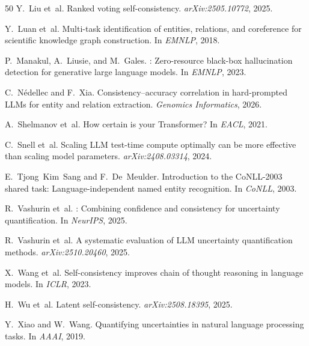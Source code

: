 \documentclass[11pt,a4paper]{article}
\begin{document}
\begin{thebibliography}{50}
Y.~Liu et~al.
\newblock Ranked voting self-consistency.
\newblock \emph{arXiv:2505.10772}, 2025.

Y.~Luan et~al.
\newblock Multi-task identification of entities, relations, and coreference for scientific knowledge graph construction.
\newblock In \emph{EMNLP}, 2018.

P.~Manakul, A.~Liusie, and M.~Gales.
: Zero-resource black-box hallucination detection for generative large language models.
\newblock In \emph{EMNLP}, 2023.

C.~N{\'e}dellec and F.~Xia.
\newblock Consistency--accuracy correlation in hard-prompted {LLM}s for entity and relation extraction.
\newblock \emph{Genomics Informatics}, 2026.

A.~Shelmanov et~al.
\newblock How certain is your {T}ransformer?
\newblock In \emph{EACL}, 2021.

C.~Snell et~al.
\newblock Scaling {LLM} test-time compute optimally can be more effective than scaling model parameters.
\newblock \emph{arXiv:2408.03314}, 2024.

E.~Tjong~Kim~Sang and F.~De~Meulder.
\newblock Introduction to the {CoNLL}-2003 shared task: Language-independent named entity recognition.
\newblock In \emph{CoNLL}, 2003.

R.~Vashurin et~al.
: Combining confidence and consistency for uncertainty quantification.
\newblock In \emph{NeurIPS}, 2025.

R.~Vashurin et~al.
\newblock A systematic evaluation of {LLM} uncertainty quantification methods.
\newblock \emph{arXiv:2510.20460}, 2025.

X.~Wang et~al.
\newblock Self-consistency improves chain of thought reasoning in language models.
\newblock In \emph{ICLR}, 2023.

H.~Wu et~al.
\newblock Latent self-consistency.
\newblock \emph{arXiv:2508.18395}, 2025.

Y.~Xiao and W.~Wang.
\newblock Quantifying uncertainties in natural language processing tasks.
\newblock In \emph{AAAI}, 2019.


\end{thebibliography}
\end{document}
